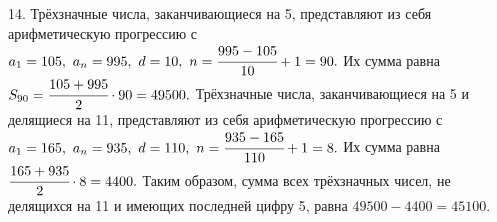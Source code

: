 14. Трёхзначные числа, заканчивающиеся на 5, представляют из себя арифметическую прогрессию с $a_1=105,\ a_n=995,\ d=10,\ n=\cfrac{995-105}{10}+1=90.$ Их сумма равна $S_{90}=\cfrac{105+995}{2}\cdot90=49500.$ Трёхзначные числа, заканчивающиеся на 5 и делящиеся на 11, представляют из себя арифметическую прогрессию с $a_1=165,\ a_n=935,\ d=110,\ n=\cfrac{935-165}{110}+1=8.$ Их сумма равна $\cfrac{165+935}{2}\cdot8=4400.$ Таким образом, сумма всех трёхзначных чисел, не делящихся на 11 и имеющих последней цифру 5, равна $49500-4400=45100.$\\
